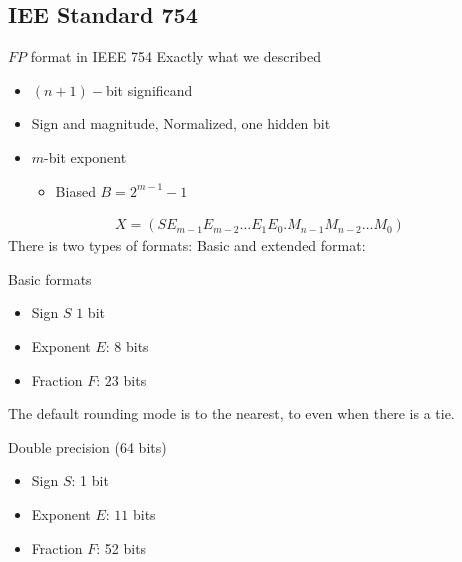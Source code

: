     \subsection{IEE Standard 754}
        \begin{parag}{$FP$ format in IEEE 754}
            Exactly what we described
            \begin{itemize}
                \item $(n+1)-$bit significand
                    \item Sign and magnitude, Normalized, one hidden bit
                    \item $m$-bit exponent 
                        \begin{itemize}
                            \item Biased $B = 2^{m-1} - 1$
                        \end{itemize}
            \end{itemize}
            \begin{align*}
                X = (SE_{m-1}E_{m-2} \dots E_1E_0 . M_{n-1}M_{n-2} \dots M_0)
            \end{align*}
    There is two types of formats: Basic and extended format:
    \begin{subparag}{Basic formats}
        \begin{itemize}
            \item Sign $S$ $1$ bit
            \item Exponent $E$: $8$ bits
            \item Fraction $F$: $23$ bits
        \end{itemize}
        The default rounding mode is to the nearest, to even when there is a tie.
    \end{subparag}
    \begin{subparag}{Double precision (64 bits)}
        \begin{itemize}
            \item Sign $S$: 1 bit
            \item Exponent $E$: $11$ bits
            \item Fraction $F$: 52 bits
        \end{itemize}
        

\end{subparag}
\end{parag}
